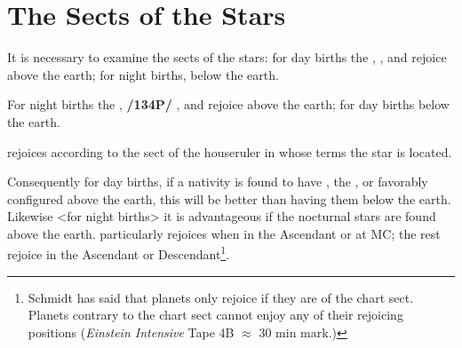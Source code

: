 \section{The Sects of the Stars}

It is necessary to examine the sects of the stars: for day births the \Sun, \Jupiter, and \Saturn\xspace rejoice above the earth; for night births, below the earth. 

For night births the \Moon, \textbf{/134P/} \Mars, and \Venus\xspace rejoice above the earth; for day births below the earth. 

\Mercury\xspace rejoices according to the sect of the houseruler in whose terms the star is located. 

Consequently for day births, if a nativity is found to have \Jupiter, the \Sun, or \Saturn favorably configured above the earth, this will be better than having them below the earth.
Likewise <for night births> it is advantageous if the nocturnal stars are found above the earth. \Venus\xspace
particularly rejoices when in the Ascendant or at MC; the rest rejoice in the Ascendant or Descendant\footnote{Schmidt has said that planets only rejoice if they are of the chart sect. Planets contrary to the chart sect cannot enjoy any of their rejoicing positions (\textsl{Einstein Intensive} Tape 4B $\approx$ 30 min mark.)}.

\newpage